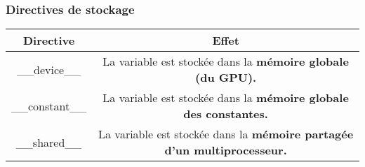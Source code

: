 \begin{frame}
    \frametitle{Directives de stockage}
    \renewcommand{\arraystretch}{2}
    \begin{tabular}{|c|c|}
        \hline
        \rowcolor{lightgray} Directive & Effet \\ \hline
        \_\_device\_\_ & \begin{minipage}{0.8\textwidth}
            La variable est stockée dans la \bf{mémoire globale} (du GPU). 
        \end{minipage} \\ \hline
        \_\_constant\_\_ & \begin{minipage}{0.8\textwidth}
            La variable est stockée dans la \bf{mémoire globale} des constantes.
        \end{minipage} \\ \hline
        \_\_shared\_\_ & \begin{minipage}{0.8\textwidth}
            La variable est stockée dans la \bf{mémoire partagée} d'un multiprocesseur.
        \end{minipage} \\ \hline
    \end{tabular}
\end{frame}

